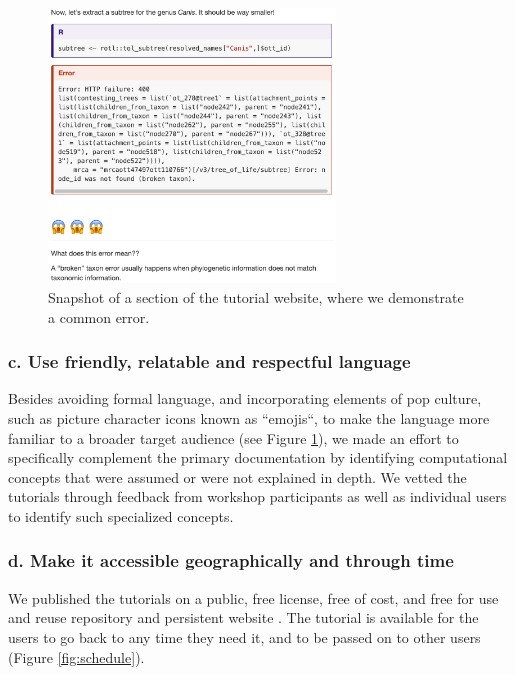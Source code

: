 \documentclass[12pt]{article}
\begin{document}

\begin{figure}
\begin{center}
\includegraphics[width=3in]{fig-error.png}
\end{center}
\caption{Snapshot of a section of the tutorial website, where we demonstrate a common error. \label{fig:error}}
\end{figure}

\subsubsection*{c. Use friendly, relatable and respectful language}


Besides avoiding formal language, and incorporating elements of pop culture, such as picture
character icons known as ``emojis``, to make the language more familiar to a
broader target audience (see Figure \ref{fig:error}), we made an effort to specifically
complement the primary documentation by identifying
computational concepts that were assumed or were not explained in depth.
We vetted the tutorials through feedback from workshop participants as well as
individual users to identify such specialized concepts.



\subsubsection*{d. Make it accessible geographically and through time}


We published the tutorials on a public, free license, free of cost, and free for
use and reuse repository and persistent website \citep{RopentreeTutorials}.
The tutorial is available for the users to go back to any time they need it,
and to be passed on to other users (Figure \ref{fig:schedule}).
\end{document}
